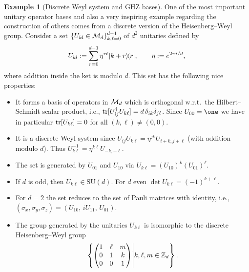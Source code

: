 \documentclass[11pt,a4paper]{article}
\numberwithin{equation}{section}
\theoremstyle{plain}
\theoremstyle{definition}
\newtheorem{example}{Example}[section]
\begin{document}
\begin{example}[Discrete Weyl system and GHZ bases]
    One of the most important unitary operator bases and also a very inspiring example
    regarding the construction of others comes from a discrete version of the
    Heisenberg--Weyl group. Consider a set
    $\{U_{kl}\in \mathcal{M}_d\}_{k,\ell=0}^{d-1}$ of $d^2$ unitaries defined by
    \begin{equation}\label{eq:2.24}
        U_{kl} := \sum_{r=0}^{d-1} \eta^{r\ell} |k+r\rangle\!\langle r|,\qquad
        \eta := e^{2\pi i/d},
    \end{equation}
    where addition inside the ket is modulo $d$. This set has the following nice
    properties:
    \begin{itemize}
        \item It forms a basis of operators in $\mathcal{M}_d$ which is orthogonal w.r.t.\ the
              Hilbert--Schmidt scalar product, i.e., $\operatorname{tr}[U_{ij}^\dagger U_{k\ell}] = d\,\delta_{ik}\delta_{j\ell}$.
              Since $U_{00}=\one$ we have in particular $\operatorname{tr}[U_{k\ell}]=0$ for all
              $(k,\ell)\ne (0,0)$.
        \item It is a discrete Weyl system since $U_{ij}U_{k\ell}=\eta^{jk}U_{i+k,j+\ell}$
              (with addition modulo $d$). Thus $U_{k\ell}^{-1}=\eta^{k\ell}U_{-k,-\ell}$.
        \item The set is generated by $U_{01}$ and $U_{10}$ via $U_{k\ell}=(U_{10})^k(U_{01})^\ell$.
        \item If $d$ is odd, then $U_{k\ell}\in \mathrm{SU}(d)$. For $d$ even
              $\det U_{k\ell} = (-1)^{k+\ell}$.
        \item For $d=2$ the set reduces to the set of Pauli matrices with identity, i.e.,
              $(\sigma_x,\sigma_y,\sigma_z)=(U_{10},\,iU_{11},\,U_{01})$.
        \item The group generated by the unitaries $U_{k\ell}$ is isomorphic to the
              discrete Heisenberg--Weyl group
              \begin{equation}\label{eq:2.25}
                  \left\{\begin{pmatrix}
                      1 &\ell &m\\
                      0 &1    &k\\
                      0 &0    &1
                  \end{pmatrix}
                  \middle|
                  k,\ell,m\in \mathbb{Z}_d\right\}.
              \end{equation}
    \end{itemize}


\end{example}
\end{document}
